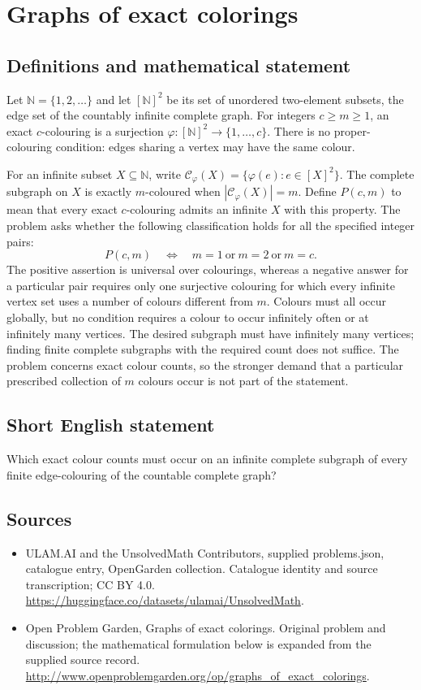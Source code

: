 \documentclass[11pt,a4paper]{article}
\begin{document}
\section*{Graphs of exact colorings}\label{statement}

\subsection{Definitions and mathematical statement}
Let $\mathbb N=\{1,2,\ldots\}$ and let $[\mathbb N]^2$ be its set of unordered
two-element subsets, the edge set of the countably infinite complete graph.
For integers $c\ge m\ge1$, an exact $c$-colouring is a surjection
$\varphi:[\mathbb N]^2\to\{1,\ldots,c\}$. There is no proper-colouring
condition: edges sharing a vertex may have the same colour.

For an infinite subset $X\subseteq\mathbb N$, write
$\mathcal C_\varphi(X)=\{\varphi(e):e\in[X]^2\}$.
The complete subgraph on $X$ is exactly $m$-coloured when
$|\mathcal C_\varphi(X)|=m$. Define $P(c,m)$ to mean that every exact
$c$-colouring admits an infinite $X$ with this property.
The problem asks whether the following classification holds for all the
specified integer pairs:
\[
 P(c,m)\quad\Longleftrightarrow\quad
 m=1\ \text{or}\ m=2\ \text{or}\ m=c.
\]
The positive assertion is universal over colourings, whereas a negative
answer for a particular pair requires only one surjective colouring for
which every infinite vertex set uses a number of colours different from $m$.
Colours must all occur globally, but no condition requires a colour to occur
infinitely often or at infinitely many vertices. The desired subgraph must
have infinitely many vertices; finding finite complete subgraphs with the
required count does not suffice. The problem concerns exact colour counts,
so the stronger demand that a particular prescribed collection of $m$
colours occur is not part of the statement.
\subsection{Short English statement}
Which exact colour counts must occur on an infinite complete subgraph of every finite edge-colouring of the countable complete graph?
\subsection{Sources}
\begin{itemize}
\item[S1] ULAM.AI and the UnsolvedMath Contributors, supplied problems.json, catalogue entry, OpenGarden collection. Catalogue identity and source transcription; CC BY 4.0.
\url{https://huggingface.co/datasets/ulamai/UnsolvedMath}.
\item[S2] Open Problem Garden, Graphs of exact colorings. Original problem and discussion; the mathematical formulation below is expanded from the supplied source record.
\url{http://www.openproblemgarden.org/op/graphs_of_exact_colorings}.
\end{itemize}
\end{document}
